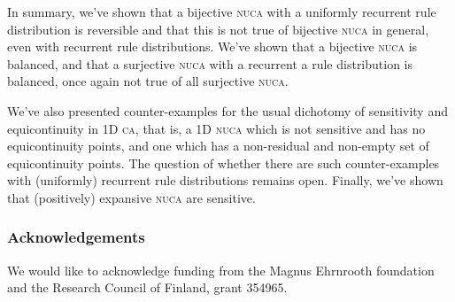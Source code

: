 \documentclass[runningheads]{llncs}
\begin{document}
In summary, we've shown that a bijective \textsc{nuca} with a uniformly recurrent rule distribution is reversible and that this is not true of bijective \textsc{nuca} in general, even with recurrent rule distributions. We've shown that a bijective \textsc{nuca} is balanced, and that a surjective \textsc{nuca} with a recurrent a rule distribution is balanced, once again not true of all surjective \textsc{nuca}. 

We've also presented counter-examples for the usual dichotomy of sensitivity and equicontinuity in 1D \textsc{ca}, that is, a 1D \textsc{nuca} which is not sensitive and has no equicontinuity points, and one which has a non-residual and non-empty set of equicontinuity points. The question of whether there are such counter-examples with (uniformly) recurrent rule distributions remains open.  Finally, we've shown that (positively) expansive \textsc{nuca} are sensitive.

\subsubsection{Acknowledgements} 

We would like to acknowledge funding from the Magnus Ehrnrooth foundation and the Research Council of Finland, grant 354965.
\end{document}
